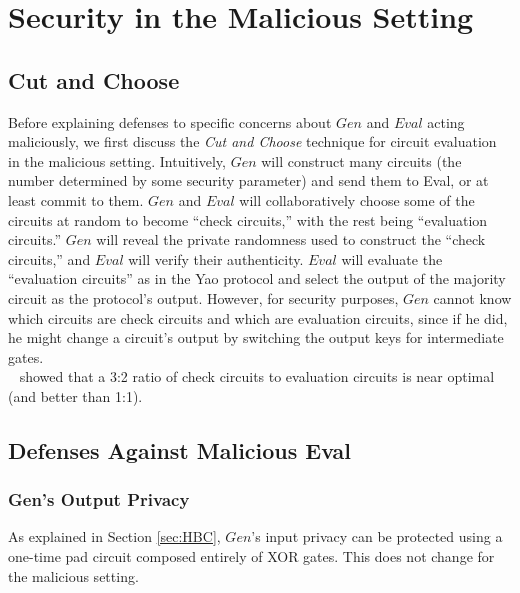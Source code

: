 \documentclass{article}
\begin{document}
\section{Security in the Malicious Setting}

\subsection{Cut and Choose}
Before explaining defenses to specific concerns about $Gen$ and $Eval$ acting maliciously, we first discuss the \emph{Cut and Choose} technique for circuit evaluation in the malicious setting. Intuitively, $Gen$ will construct many circuits (the number determined by some security parameter) and send them to Eval, or at least commit to them. $Gen$ and $Eval$ will collaboratively choose some of the circuits at random to become ``check circuits,'' with the rest being ``evaluation circuits.'' $Gen$ will reveal the private randomness used to construct the ``check circuits,'' and $Eval$ will verify their authenticity. $Eval$ will evaluate the ``evaluation circuits'' as in the Yao protocol and select the output of the majority circuit as the protocol's output. However, for security purposes, $Gen$ cannot know which circuits are check circuits and which are evaluation circuits, since if he did, he might change a circuit's output by switching the output keys for intermediate gates. \\

~\cite{two-output} showed that a 3:2 ratio of check circuits to evaluation circuits is near optimal (and better than 1:1). 


\subsection{Defenses Against Malicious Eval}

\subsubsection{Gen's Output Privacy} \label{sec:gen-out-priv-defense}

As explained in Section \ref{sec:HBC}, $Gen$'s input privacy can be protected using a one-time pad circuit composed entirely of XOR gates. This does not change for the malicious setting.
\end{document}
